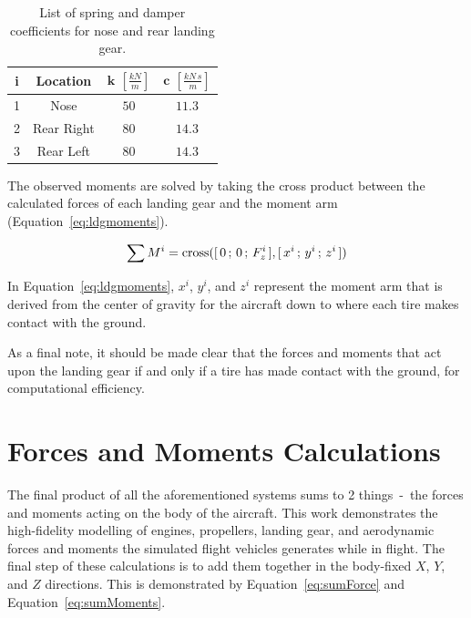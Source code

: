 \begin{table}[!ht]\label{tbl:ldgcoeff}
    \caption{List of spring and damper coefficients for nose and rear landing gear.}
    \centering
    \begin{tabular}{cccc}
        \toprule
        \textbf{i} & \textbf{Location} & \(\mathbf{k}\) \(  \left[\frac{kN}{m}\right]\) & \(\mathbf{c}\) \( \left[\frac{kN\,s}{m}\right]\) \\
        \midrule
        1          & Nose              & \(50\)                                         & \(11.3\)                                         \\
        2          & Rear Right        & \(80\)                                         & \(14.3\)                                         \\
        3          & Rear Left         & \(80\)                                         & \(14.3\)                                         \\
        \bottomrule
    \end{tabular}
\end{table}

The observed moments are solved by taking the cross product between the calculated forces of each landing gear and the moment arm (Equation~\ref{eq:ldgmoments}).

\begin{equation}
    \sum M^i = \textnormal{cross}([\,0\,;\,0\,;\,F^i_z\,],[\,x^i\,;\,y^i\,;\,z^i\,])
    \label{eq:ldgmoments}
\end{equation}

In Equation~\ref{eq:ldgmoments}, \(x^i\), \(y^i\), and \(z^i\) represent the moment arm that is derived from the center of gravity for the aircraft down to where each tire makes contact with the ground.

As a final note, it should be made clear that the forces and moments that act upon the landing gear if and only if a tire has made contact with the ground, for computational efficiency.

\section{Forces and Moments Calculations}
The final product of all the aforementioned systems sums to 2 things~-~the forces and moments acting on the body of the aircraft. This work demonstrates the high-fidelity modelling of engines, propellers, landing gear, and aerodynamic forces and moments the simulated flight vehicles generates while in flight. The final step of these calculations is to add them together in the body-fixed \(X\), \(Y\), and \(Z\) directions. This is demonstrated by Equation~\ref{eq:sumForce} and Equation~\ref{eq:sumMoments}.

